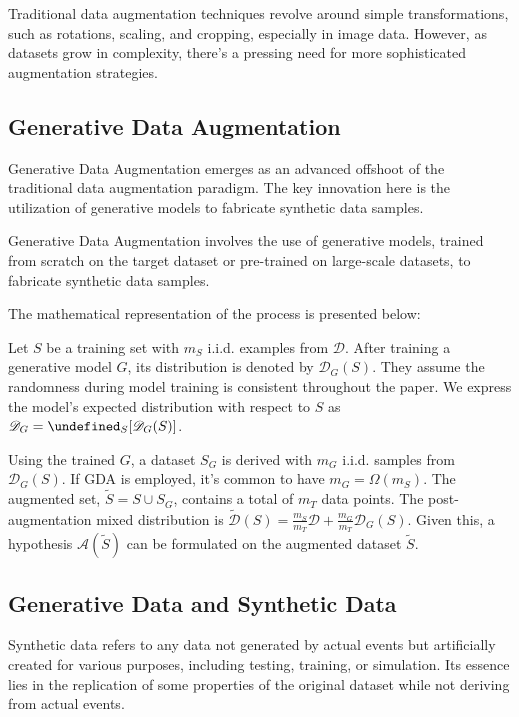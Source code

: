 \documentclass[preprint,12pt,authoryear]{elsarticle}
\newcommand{\E}{\mathbb{E}}
\newcommand{\sA}{{\mathscr A}}
\newcommand{\sD}{{\mathscr D}}
\newcommand{\DG}{\sD_G(S)}
\let\E\undefined
\newcommand{\E}{\mathbb E}
\newcommand{\Saug}{\widetilde{S}}
\newcommand{\Daug}{\widetilde{\sD}}
\begin{document}
Traditional data augmentation techniques revolve around simple transformations, such as rotations, scaling, and cropping, especially in image data. However, as datasets grow in complexity, there's a pressing need for more sophisticated augmentation strategies.

\subsection{Generative Data Augmentation}
Generative Data Augmentation emerges as an advanced offshoot of the traditional data augmentation paradigm. The key innovation here is the utilization of generative models to fabricate synthetic data samples.

Generative Data Augmentation involves the use of generative models, trained from scratch on the target dataset or pre-trained on large-scale datasets, to fabricate synthetic data samples. 

The mathematical representation of the process is presented below:

 Let $S$ be a training set with $m_S$ i.i.d. examples from $\sD$. After training a generative model $G$, its distribution is denoted by $\DG$. They\cite{60_Theory} assume the randomness during model training is consistent throughout the paper. We express the model's expected distribution with respect to $S$ as $\sD_G = \E_S[\DG]$. 

Using the trained $G$, a dataset $S_G$ is derived with $m_G$ i.i.d. samples from $\DG$. If GDA is employed, it's common to have $m_G = \Omega(m_S)$. The augmented set, $\Saug = S \cup S_G$, contains a total of $m_T$ data points. The post-augmentation mixed distribution is $\Daug(S) = \frac{m_S}{m_T} \sD + \frac{m_G}{m_T} \DG$. Given this, a hypothesis $\sA(\Saug)$ can be formulated on the augmented dataset $\widetilde{S}$. 

\subsection{Generative Data and Synthetic Data}

Synthetic data\cite{61_synthetic_data,62_synthetic_data,63_synthetic_data,64_synthetic_data,65_synthetic_data,66_synthetic_data,67_synthetic_data,68_synthetic_data} refers to any data not generated by actual events but artificially created for various purposes, including testing, training, or simulation. Its essence lies in the replication of some properties of the original dataset while not deriving from actual events.
\end{document}
